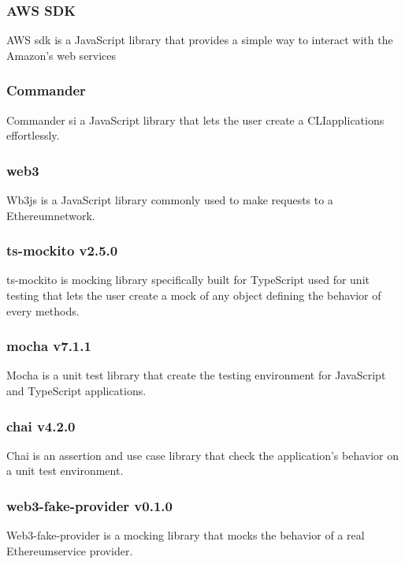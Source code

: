 \subsubsection*{AWS SDK}
AWS sdk is a JavaScript library that provides a simple way to interact with the Amazon’s web services

\subsubsection*{Commander}
Commander si a JavaScript library that lets the user create a CLI\glo applications effortlessly.

\subsubsection*{web3}
Wb3js is a JavaScript library commonly used to make requests to a Ethereum\glo network.

\subsubsection*{ts-mockito v2.5.0}
ts-mockito is mocking library specifically built for TypeScript used for unit testing that lets the user create a mock of any object defining the behavior of every methods.

\subsubsection*{mocha v7.1.1}
Mocha is a unit test library that create the testing environment for JavaScript and TypeScript applications.

\subsubsection*{chai v4.2.0}
Chai is an assertion and use case library that check the application's behavior on a unit test environment.

\subsubsection*{web3-fake-provider v0.1.0}
Web3-fake-provider is a mocking library that mocks the behavior of a real Ethereum\glo service provider.

